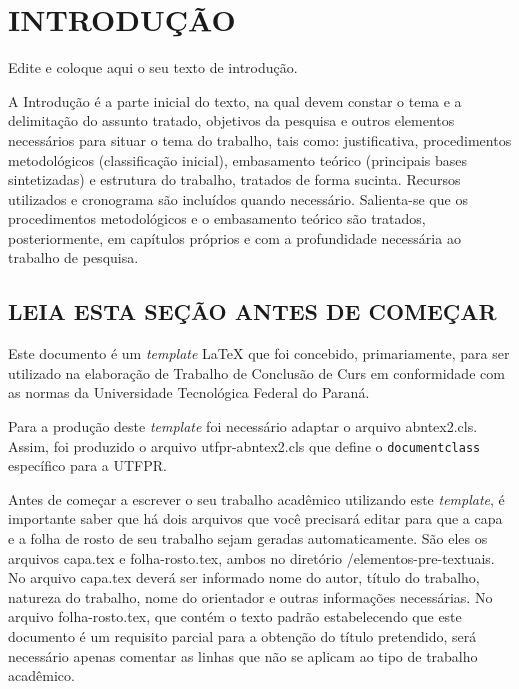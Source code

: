 \chapter{INTRODUÇÃO}
\label{chap:introducao}

Edite e coloque aqui o seu texto de introdução.

A Introdução é a parte inicial do texto, na qual devem constar o tema e a delimitação do assunto tratado, objetivos da pesquisa e outros elementos necessários para situar o tema do trabalho, tais como: justificativa, procedimentos metodológicos (classificação inicial), embasamento teórico (principais bases sintetizadas) e estrutura do trabalho, tratados de forma sucinta. Recursos utilizados e cronograma são incluídos quando necessário. Salienta-se que os procedimentos metodológicos e o embasamento teórico são tratados, posteriormente, em capítulos próprios e com a profundidade necessária ao trabalho de pesquisa.

\section{LEIA ESTA SEÇÃO ANTES DE COMEÇAR}
\label{sec:antesleiame}

Este documento é um \emph{template} \LaTeX{} que foi concebido, primariamente, para ser utilizado na elaboração de Trabalho de Conclusão de Curs em conformidade com as normas da Universidade Tecnológica Federal do Paraná.

Para a produção deste \emph{template} foi necessário adaptar o arquivo {\ttfamily abntex2.cls}. Assim, foi produzido o arquivo {\ttfamily utfpr-abntex2.cls} que define o \verb|documentclass| específico para a UTFPR.

Antes de começar a escrever o seu trabalho acadêmico utilizando este \emph{template}, é importante saber que há dois arquivos que você precisará editar para que a capa e a folha de rosto de seu trabalho sejam geradas automaticamente.
São eles os arquivos {\ttfamily capa.tex} e {\ttfamily folha-rosto.tex}, ambos no diretório  {\ttfamily /elementos-pre-textuais}.
No arquivo {\ttfamily capa.tex} deverá ser informado nome do autor, título do trabalho, natureza do trabalho, nome do orientador e outras informações necessárias.
No arquivo {\ttfamily folha-rosto.tex}, que contém o texto padrão estabelecendo que este documento é um requisito parcial para a obtenção do título pretendido, será necessário apenas comentar as linhas que não se aplicam ao tipo de trabalho acadêmico.

